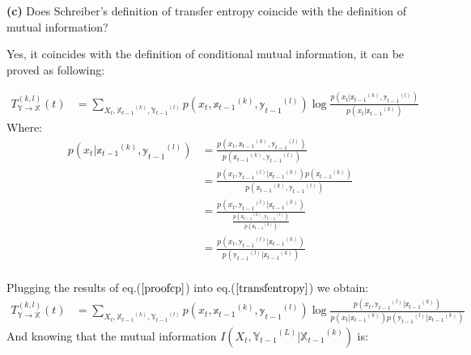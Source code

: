 \documentclass[11pt]{article}
\makeatletter
\newenvironment{proofw}{\par
	\pushQED{\qed}%
	\normalfont \topsep6\p@\@plus6\p@\relax
	\trivlist
	\item[]\ignorespaces
}{%
	\popQED\endtrivlist\@endpefalse
}
\makeatother
\begin{document}
\begin{tcolorbox}
\textbf{(c)}
Does Schreiber’s definition of transfer entropy coincide with the
definition of mutual information?
\end{tcolorbox}
\begin{proofw}


Yes, it coincides with the definition of conditional mutual information, it can be proved as following:

\begin{equation}\label{transfentropy}
\begin{split}
{T}^{(k,l)}_{\mathbb{Y}\rightarrow \mathbb{X}}(t) &= \sum_{X_{t}, {\mathbb{X}_{t-1}}^{(k)},{\mathbb{Y}_{t-1}}^{(l)}} p(x_{t}, {\mathbb{x}_{t-1}}^{(k)},{\mathbb{y}_{t-1}}^{(l)}) \log \frac{p(x_{t}|{\mathbb{x}_{t-1}}^{(k)},{\mathbb{y}_{t-1}}^{(l)})}{p(x_{t}|{\mathbb{x}_{t-1}}^{(k)})}
\end{split}
\end{equation}
Where: 
\begin{equation}\label{proofcp}
\begin{split}
p(x_{t}|{\mathbb{x}_{t-1}}^{(k)},{\mathbb{y}_{t-1}}^{(l)}) &= \frac{p(x_{t},{\mathbb{x}_{t-1}}^{(k)},{\mathbb{y}_{t-1}}^{(l)}) }{p({\mathbb{x}_{t-1}}^{(k)},{\mathbb{y}_{t-1}}^{(l)})}\\
&= \frac{p(x_{t},{\mathbb{y}_{t-1}}^{(l)}|{\mathbb{x}_{t-1}}^{(k)}) p({\mathbb{x}_{t-1}}^{(k)})} {p({\mathbb{x}_{t-1}}^{(k)},{\mathbb{y}_{t-1}}^{(l)})}\\
&=\frac{p(x_{t},{\mathbb{y}_{t-1}}^{(l)}|{\mathbb{x}_{t-1}}^{(k)})}{\frac{p({\mathbb{x}_{t-1}}^{(k)},{\mathbb{y}_{t-1}}^{(l)})}{p({\mathbb{x}_{t-1}}^{(k)})}}\\
&= \frac{p(x_{t},{\mathbb{y}_{t-1}}^{(l)}|{\mathbb{x}_{t-1}}^{(k)})} {p({\mathbb{y}_{t-1}}^{(l)}|{\mathbb{x}_{t-1}}^{(k)})}\\
\end{split}
\end{equation}

Plugging the results of eq.($\ref{proofcp}$) into eq.($\ref{transfentropy}$) we obtain:
\begin{equation*}
\begin{split}
{T}^{(k,l)}_{\mathbb{Y}\rightarrow \mathbb{X}}(t) &= \sum_{X_{t}, {\mathbb{X}_{t-1}}^{(k)},{\mathbb{Y}_{t-1}}^{(l)}} p(x_{t}, {\mathbb{x}_{t-1}}^{(k)},{\mathbb{y}_{t-1}}^{(l)}) \log \frac{p(x_{t},{\mathbb{y}_{t-1}}^{(l)}|{\mathbb{x}_{t-1}}^{(k)})}{p(x_{t}|{\mathbb{x}_{t-1}}^{(k)})p({\mathbb{y}_{t-1}}^{(l)}|{\mathbb{x}_{t-1}}^{(k)})}
\end{split}
\end{equation*}
And knowing that the mutual information $I(X_{t}, {\mathbb{Y}_{t-1}}^{(L)}|{\mathbb{X}_{t-1}}^{(k)})$ is:


\end{proofw}
\end{document}
